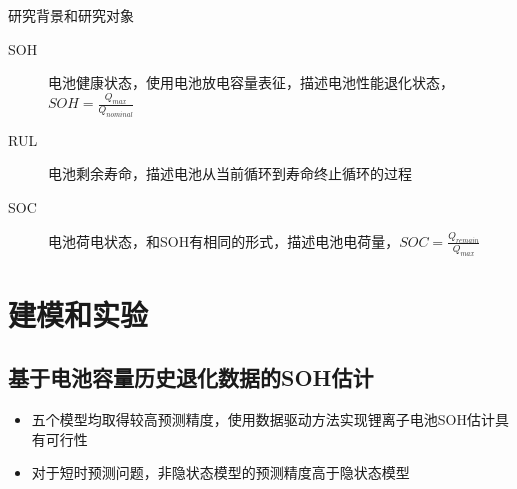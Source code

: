 \documentclass{beamer}
\begin{document}
\begin{frame}{\small 研究背景和研究对象}
\begin{figure}[htbp]
		  \label{fig:subfig_1}            %
		\end{figure}
	\begin{description}
		\item[SOH]
		电池健康状态，使用电池放电容量表征，描述电池性能退化状态，$SOH = \frac{Q_{max}}{Q_{nominal}}$
		\item[RUL]
		电池剩余寿命，描述电池从当前循环到寿命终止循环的过程
		\item[SOC]
		电池荷电状态，和SOH有相同的形式，描述电池电荷量，$SOC = \frac{Q_{remain}}{Q_{max}}$
	\end{description}
\end{frame}

\section{建模和实验}

\subsection{基于电池容量历史退化数据的SOH估计}

\begin{frame}
\end{frame}

\begin{frame}
\begin{table}[]
	\centering
	\caption{五种模型预测性能评估结果}
	\end{table}
	\begin{itemize}
		\item 五个模型均取得较高预测精度，使用数据驱动方法实现锂离子电池SOH估计具有可行性
		\item 对于短时预测问题，非隐状态模型的预测精度高于隐状态模型
	\end{itemize}
\end{frame}
\end{document}
